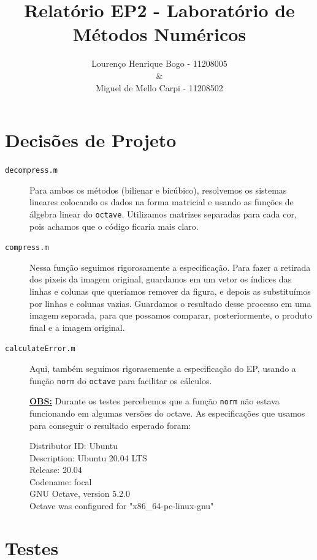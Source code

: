 \documentclass[12pt]{article}
\title{Relatório EP2 - Laboratório de Métodos Numéricos}
\author{Lourenço Henrique Bogo - 11208005 \\ \& \\Miguel de Mello Carpi - 11208502}
\date{}
\newcommand{\mytitle}[1]{\textbf{\underline{#1}}}
\begin{document}
\maketitle

\section{Decisões de Projeto}

\begin{description}
  
\item[\texttt{decompress.m}] Para ambos os métodos (bilienar e bicúbico), resolvemos os sistemas lineares colocando os dados na forma matricial e usando as funções de álgebra linear do \texttt{octave}. Utilizamos matrizes separadas para cada cor, pois achamos que o código ficaria mais claro.
  
\item[\texttt{compress.m}] Nessa função seguimos rigorosamente a especificação. Para fazer a retirada dos pixeis da imagem original, guardamos em um vetor os índices das linhas e colunas que queríamos remover da figura, e depois as substituímos por linhas e colunas vazias. Guardamos o resultado desse processo em uma imagem separada, para que possamos comparar, posteriormente, o produto final e a imagem original.
  
\item[\texttt{calculateError.m}] Aqui, também seguimos rigorasemente a especificação do EP, usando a função \texttt{norm} do \texttt{octave} para facilitar os cálculos.

  \mytitle{OBS:} Durante os testes percebemos que a função \texttt{norm} não estava funcionando em algumas versões do octave.
  As especificações que usamos para conseguir o resultado esperado foram:

  Distributor ID:  Ubuntu\\
  Description:  Ubuntu 20.04 LTS\\
  Release:  20.04\\
  Codename:  focal\\

  GNU Octave, version 5.2.0\\
  Octave was configured for "x86\_64-pc-linux-gnu"\\
  
\end{description}

\section{Testes}
\end{document}
